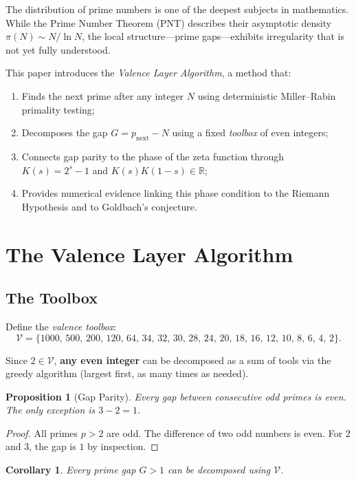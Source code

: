 \documentclass[12pt,a4paper]{article}
\theoremstyle{plain}
\newtheorem{proposition}[theorem]{Proposition}
\newtheorem{corollary}[theorem]{Corollary}
\begin{document}
The distribution of prime numbers is one of the deepest subjects in
mathematics.  While the Prime Number Theorem (PNT) describes their
asymptotic density $\pi(N)\sim N/\ln N$, the local structure---prime
gaps---exhibits irregularity that is not yet fully understood.

This paper introduces the {\it Valence Layer Algorithm}, a method that:
\begin{enumerate}
  \item Finds the next prime after any integer $N$ using
    deterministic Miller--Rabin primality testing;
  \item Decomposes the gap $G=p_{\text{next}}-N$ using a fixed
    {\it toolbox} of even integers;
  \item Connects gap parity to the phase of the zeta function
    through $K(s)=2^s-1$ and $K(s)K(1-s)\in\mathbb{R}$;
  \item Provides numerical evidence linking this phase condition
    to the Riemann Hypothesis and to Goldbach's conjecture.
\end{enumerate}

\section{The Valence Layer Algorithm}
\label{sec:alg}

\subsection{The Toolbox}
\label{sec:tools}

Define the {\it valence toolbox}:
\[
\mathcal{V} = \{1000,\,500,\,200,\,120,\,64,\,34,\,32,\,30,\,28,\,24,\,
20,\,18,\,16,\,12,\,10,\,8,\,6,\,4,\,2\}.
\]

Since $2\in\mathcal{V}$, {\bf any even integer} can be decomposed as
a sum of tools via the greedy algorithm (largest first, as many times
as needed).

\begin{proposition}[Gap Parity]
\label{prop:parity}
Every gap between consecutive odd primes is even.
The only exception is $3-2=1$.
\end{proposition}
\begin{proof}
All primes $p>2$ are odd.  The difference of two odd numbers is even.
For $2$ and $3$, the gap is $1$ by inspection.
\end{proof}

\begin{corollary}
\label{coro:decomp}
Every prime gap $G>1$ can be decomposed using $\mathcal{V}$.
\end{corollary}
\end{document}
